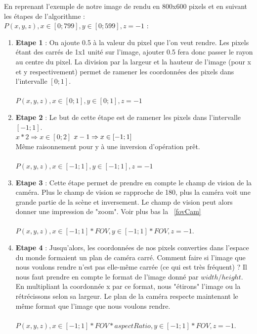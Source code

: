 \documentclass[11pt]{article}
\begin{document}
En reprenant l'exemple de notre image de rendu en 800x600 pixels et en suivant les étapes de l'algorithme \label{conversionPixel}:\\
$P(x, y, z), x \in [0; 799], y \in [0; 599], z = -1$ :
\begin{enumerate}
	\item{\textbf{Etape 1} : On ajoute 0.5 à la valeur du pixel que l'on veut rendre. Les pixels étant des carrés de 1x1 unité sur l'image, ajouter 0.5 fera donc passer le rayon au centre du pixel. La division par la largeur et la hauteur de l'image (pour x et y respectivement) permet de ramener les coordonnées des pixels dans l'intervalle $[0; 1]$.\\
		\hfill\\
	         	$P(x, y, z), x \in [0; 1], y \in[0; 1], z = -1$}
	\item{\textbf{Etape 2} : Le but de cette étape est de ramener les pixels dans l'intervalle $[-1; 1]$.\\
		$x*2 \Rightarrow x \in [0; 2]$
		$\\x - 1 \Rightarrow x \in [-1; 1]$\\
		Même raisonnement pour y à une inversion d'opération prêt.\\
		\hfill\\
	          	$P(x, y, z), x \in [-1; 1], y \in[-1; 1], z = -1$}
	\item{\textbf{Etape 3} : Cette étape permet de prendre en compte le champ de vision de la caméra. Plus le champ de vision se rapproche de 180\degree, plus la caméra voit une grande partie de la scène et inversement. Le champ de vision peut alors donner une impression de "zoom". Voir plus bas la \figurename~\ref{fovCam}\\\hfill\\
		$P(x,y , z), x \in [-1; 1]*FOV, y \in [-1; 1]*FOV, z = -1$.}\\
	\item{\textbf{Etape 4} : Jusqu'alors, les coordonnées de nos pixels converties dans l'espace du monde formaient un plan de caméra carré. Comment faire si l'image que nous voulons rendre n'est pas elle-même carrée (ce qui est très fréquent) ? Il nous faut prendre en compte le format de l'image donné par $width/height$. En multipliant la coordonnée x par ce format, nous "étirons" l'image ou la rétrécissons selon sa largeur. Le plan de la caméra respecte maintenant le même format que l'image que nous voulons rendre.\\\hfill\\
		$P(x,y , z), x \in [-1; 1]*FOV*aspectRatio, y \in [-1; 1]*FOV, z = -1$.}
\end{enumerate}
\end{document}

